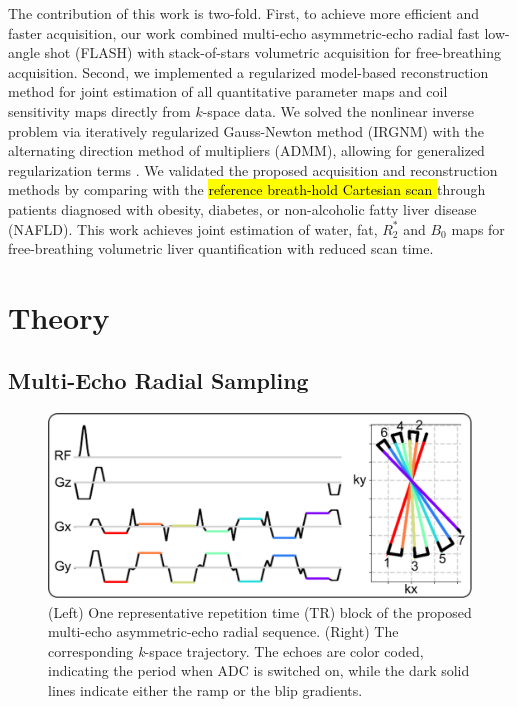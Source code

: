 \documentclass[journal,twoside,web]{ieeecolor}
\begin{document}
\marginnote[R2.13]

The contribution of this work is two-fold.
First, to achieve more efficient and faster acquisition, 
our work combined multi-echo asymmetric-echo radial fast low-angle shot (FLASH) 
with stack-of-stars volumetric acquisition \cite{block_2014_rad}
for free-breathing acquisition. 
Second, we implemented a regularized model-based reconstruction method 
for joint estimation of all quantitative parameter maps 
and coil sensitivity maps directly from $k$-space data. 
We solved the nonlinear inverse problem via 
iteratively regularized Gauss-Newton method (IRGNM) \cite{uecker_2008_nlinv} 
with the alternating direction method of multipliers (ADMM), 
allowing for generalized regularization terms \cite{boyd_2010_admm}. 
We validated the proposed acquisition and reconstruction methods by 
comparing with the \hl{reference breath-hold Cartesian scan \mbox{\cite{zhong_2014_wfadafit}}} 
through patients diagnosed with obesity, diabetes, or non-alcoholic fatty liver disease (NAFLD). 
This work achieves joint estimation of water, fat, $R_2^*$ and $B_0$ maps for free-breathing volumetric liver 
quantification with reduced scan time.



\section{Theory}

\subsection{Multi-Echo Radial Sampling}

\begin{figure}
	\centering
	\includegraphics[width=\columnwidth]{../../figures/tan1.pdf}
	\caption{(Left) One representative repetition time (TR) block of 
		the proposed multi-echo asymmetric-echo radial sequence. 
		(Right) The corresponding \textit{k}-space trajectory. 
		The echoes are color coded, indicating the period when ADC is switched on, 
		while the dark solid lines indicate either the ramp or the blip gradients.}
	\label{FIG:SEQ}
\end{figure}
\end{document}
